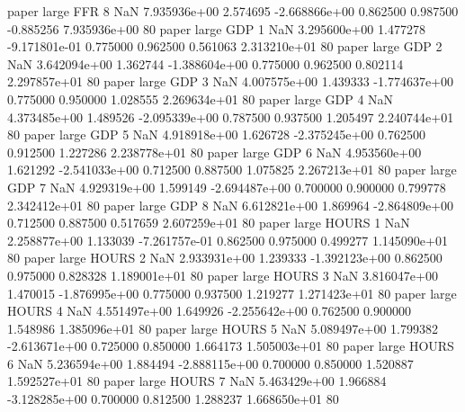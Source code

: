             paper      large      FFR                 8                  NaN 7.935936e+00      2.574695 -2.668866e+00 0.862500 0.987500      -0.885256 7.935936e+00 80
            paper      large      GDP                 1                  NaN 3.295600e+00      1.477278 -9.171801e-01 0.775000 0.962500       0.561063 2.313210e+01 80
            paper      large      GDP                 2                  NaN 3.642094e+00      1.362744 -1.388604e+00 0.775000 0.962500       0.802114 2.297857e+01 80
            paper      large      GDP                 3                  NaN 4.007575e+00      1.439333 -1.774637e+00 0.775000 0.950000       1.028555 2.269634e+01 80
            paper      large      GDP                 4                  NaN 4.373485e+00      1.489526 -2.095339e+00 0.787500 0.937500       1.205497 2.240744e+01 80
            paper      large      GDP                 5                  NaN 4.918918e+00      1.626728 -2.375245e+00 0.762500 0.912500       1.227286 2.238778e+01 80
            paper      large      GDP                 6                  NaN 4.953560e+00      1.621292 -2.541033e+00 0.712500 0.887500       1.075825 2.267213e+01 80
            paper      large      GDP                 7                  NaN 4.929319e+00      1.599149 -2.694487e+00 0.700000 0.900000       0.799778 2.342412e+01 80
            paper      large      GDP                 8                  NaN 6.612821e+00      1.869964 -2.864809e+00 0.712500 0.887500       0.517659 2.607259e+01 80
            paper      large    HOURS                 1                  NaN 2.258877e+00      1.133039 -7.261757e-01 0.862500 0.975000       0.499277 1.145090e+01 80
            paper      large    HOURS                 2                  NaN 2.933931e+00      1.239333 -1.392123e+00 0.862500 0.975000       0.828328 1.189001e+01 80
            paper      large    HOURS                 3                  NaN 3.816047e+00      1.470015 -1.876995e+00 0.775000 0.937500       1.219277 1.271423e+01 80
            paper      large    HOURS                 4                  NaN 4.551497e+00      1.649926 -2.255642e+00 0.762500 0.900000       1.548986 1.385096e+01 80
            paper      large    HOURS                 5                  NaN 5.089497e+00      1.799382 -2.613671e+00 0.725000 0.850000       1.664173 1.505003e+01 80
            paper      large    HOURS                 6                  NaN 5.236594e+00      1.884494 -2.888115e+00 0.700000 0.850000       1.520887 1.592527e+01 80
            paper      large    HOURS                 7                  NaN 5.463429e+00      1.966884 -3.128285e+00 0.700000 0.812500       1.288237 1.668650e+01 80
